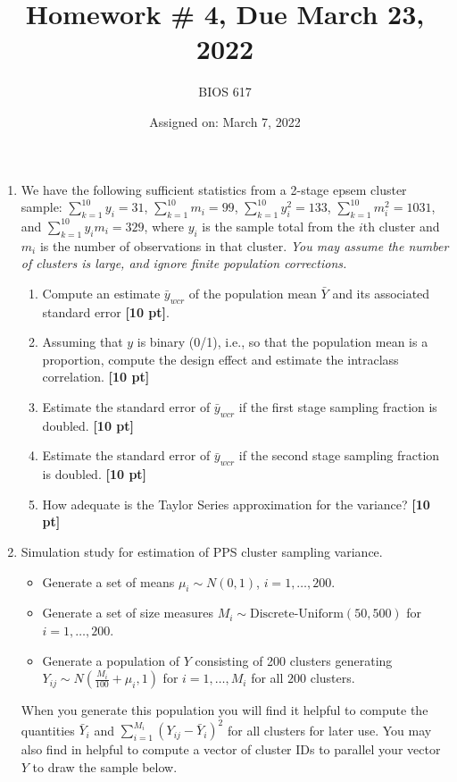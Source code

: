 \documentclass[12pt]{article}
\begin{document}
\title{Homework \# 4, Due March 23, 2022}
\author{BIOS 617}
\date{Assigned on: March 7, 2022}

\maketitle

\begin{enumerate}
\setlength{\itemsep}{15pt}%
\setlength{\parskip}{15pt}%

\item  We have the following sufficient statistics from a 2-stage epsem cluster sample: $\sum_{k=1}^{10} y_i = 31$, $\sum_{k=1}^{10} m_i = 99$, $\sum_{k=1}^{10} y_i^2 = 133$, $\sum_{k=1}^{10} m_i^2 = 1031$, and $\sum_{k=1}^{10} y_i m_i = 329$, where $y_i$ is the sample total from the $i$th cluster and $m_i$ is the number of observations in that cluster.  {\it You may assume the number of clusters is large, and ignore finite population corrections.}
	\begin{enumerate}[itemsep=5ex]
	\item Compute an estimate $\bar y_{wcr}$ of the population mean $\bar Y$ and its associated standard error {\bf [10 pt]}.
	\item Assuming that $y$ is binary (0/1), i.e., so that the population mean is a proportion, compute the design effect and estimate the intraclass correlation. {\bf [10 pt]}
	\item Estimate the standard error of $\bar y_{wcr}$ if the first stage sampling fraction is doubled. {\bf [10 pt]}
	\item Estimate the standard error of $\bar y_{wcr}$ if the second stage sampling fraction is doubled. {\bf [10 pt]}
	\item How adequate is the Taylor Series approximation for the variance? {\bf [10 pt]}
	\end{enumerate}
	\pagebreak

\item  Simulation study for estimation of PPS cluster sampling variance.
\begin{itemize}
\item Generate a set of means $\mu_i \sim N(0,1)$, $i=1,\ldots,200$.
\item Generate a set of size measures $M_i \sim \text{Discrete-Uniform} (50,500)$ for $i=1,\ldots,200$.
\item Generate a population of $Y$ consisting of 200 clusters generating $Y_{ij} \sim N \left( \frac{M_i}{100} + \mu_i, 1 \right)$ for $i=1,\ldots,M_i$ for all $200$ clusters.
\end{itemize}
When you generate this population you will find it helpful to compute the quantities $\bar Y_i$ and $\sum_{i=1}^{M_i} (Y_{ij} - \bar Y_i)^2$ for all clusters for later use.  You may also find in helpful to compute a vector of cluster IDs to parallel your vector $Y$ to draw the sample below.




\end{enumerate}
\end{document}
